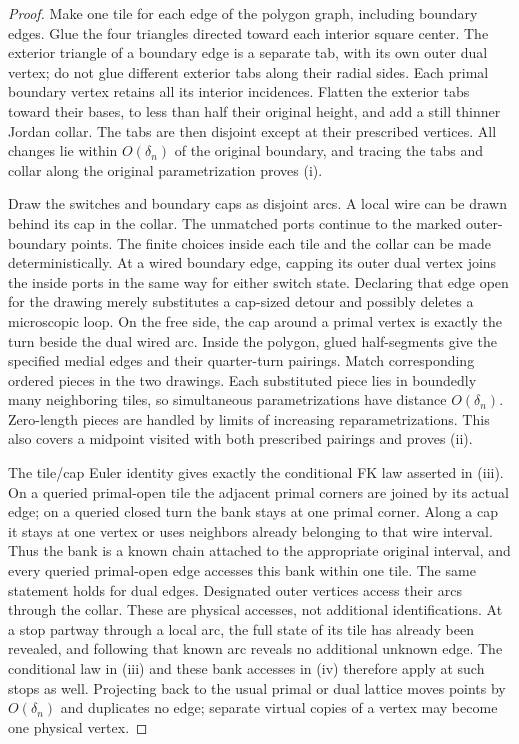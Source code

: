 \begin{proof}
Make one tile for each edge of the polygon graph, including boundary
edges.  Glue the four triangles directed toward each interior square
center.  The exterior triangle of a boundary edge is a separate tab,
with its own outer dual vertex; do not glue different exterior tabs
along their radial sides.  Each primal boundary vertex retains all
its interior incidences.  Flatten the exterior tabs toward their
bases, to less than half their original height, and add a still
thinner Jordan collar.  The tabs are then disjoint except at their
prescribed vertices.  All changes lie within $O(\delta_n)$ of the
original boundary, and tracing the tabs and collar along the original
parametrization proves (i).

Draw the switches and boundary caps as disjoint arcs.  A local wire
can be drawn behind its cap in the collar.  The unmatched ports
continue to the marked outer-boundary points.  The finite choices
inside each tile and the collar can be made deterministically.
At a wired boundary edge, capping its outer dual vertex joins the
inside ports in the same way for either switch state.  Declaring that
edge open for the drawing merely substitutes a cap-sized detour and
possibly deletes a microscopic loop.  On the free side, the cap
around a primal vertex is exactly the turn beside the dual wired
arc.  Inside the polygon, glued half-segments give the specified
medial edges and their quarter-turn pairings.  Match corresponding
ordered pieces in the two drawings.  Each substituted piece lies in
boundedly many neighboring tiles, so simultaneous parametrizations
have distance $O(\delta_n)$.  Zero-length pieces are handled by limits
of increasing reparametrizations.  This also covers a midpoint visited
with both prescribed pairings and proves (ii).

The tile/cap Euler identity gives exactly the conditional FK law
asserted in (iii).  On a queried primal-open tile the adjacent primal
corners are joined by its actual edge; on a queried closed turn the
bank stays at one primal corner.  Along a cap it stays at one vertex
or uses neighbors already belonging to that wire interval.  Thus the
bank is a known chain attached to the appropriate original interval,
and every queried primal-open edge accesses this bank within one tile.
The same statement holds for dual edges.  Designated outer vertices
access their arcs through the collar.  These are physical accesses,
not additional identifications.  At a stop partway through a local arc,
the full state of its tile has already been revealed, and following
that known arc reveals no additional unknown edge.  The conditional
law in (iii) and these bank accesses in (iv) therefore apply at such
stops as well.  Projecting back to the usual primal
or dual lattice moves points by $O(\delta_n)$ and duplicates no edge;
separate virtual copies of a vertex may become one physical vertex.
\end{proof}

